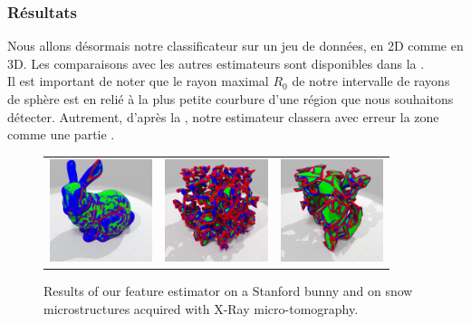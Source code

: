 \subsubsection{Résultats}%
\label{sec:applications:feature:II:results}
%
Nous allons désormais notre classificateur sur un jeu de données, en 2D comme en
3D. Les comparaisons avec les autres estimateurs sont disponibles dans la
.
%
\\
%
Il est important de noter que le rayon maximal $R_0$ de notre intervalle de
rayons de sphère est en relié à la plus petite courbure d'une région \featsmooth
que nous souhaitons détecter. Autrement, d'après la
, notre estimateur classera avec erreur la zone
comme une partie \featflat.
%
%
%
\begin{figure}[ht]
  \begin{center}
    \setlength{\tabcolsep}{1pt}
    \begin{tabular}{c c c}
      \includegraphics[width=3cm]{images/Feature/Bunny_512_II_scale} &
      \includegraphics[width=3cm]{images/Feature/Snow_I08_II_scale} &
      \includegraphics[width=3cm]{images/Feature/Snow_E2bis_II_scale} \\
    \end{tabular}
    \caption{Results of our feature estimator on a Stanford bunny and on snow microstructures acquired with X-Ray micro-tomography.\label{fig:feature-snow}}
  \end{center}
\end{figure}

